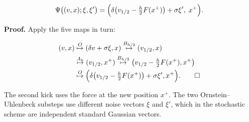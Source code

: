 \documentclass[11pt,a4paper]{article}
\begin{document}
\[\Psi\bigl((v,x);\xi,\xi'\bigr)=\Bigl(\delta\bigl(v_{1/2}-\tfrac h2F(x^+)\bigr)+\sigma\xi',\;x^+\Bigr).\]


\textbf{Proof.} Apply the five maps in turn:


\[\begin{aligned}
(v,x)&\overset{O}{\mapsto}(\delta v+\sigma\xi,x)
\overset{B_{h/2}}{\mapsto}(v_{1/2},x)\\
&\overset{A_h}{\mapsto}(v_{1/2},x^+)
\overset{B_{h/2}}{\mapsto}\bigl(v_{1/2}-\tfrac h2F(x^+),x^+\bigr)\\
&\overset{O}{\mapsto}\Bigl(\delta\bigl(v_{1/2}-\tfrac h2F(x^+)\bigr)+\sigma\xi',x^+\Bigr).
\qquad\square
\end{aligned}\]


The second kick uses the force at the new position \(x^+\). The two Ornstein–Uhlenbeck substeps use different noise vectors \(\xi\) and \(\xi'\), which in the stochastic scheme are independent standard Gaussian vectors.
\end{document}
